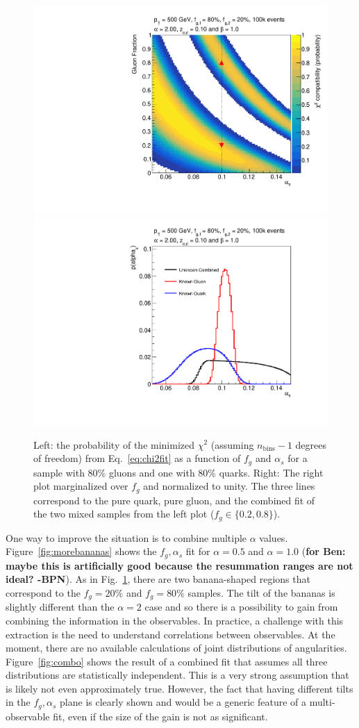 \begin{figure}[h!]
\begin{center}
\includegraphics[width = 0.45\columnwidth]{figures/banana_alpha_2_00beta_1_00_zcut_0_100.pdf}\includegraphics[width = 0.45\columnwidth]{figures/palpha_alpha_2_0beta_1_0_zcut_0_1000.pdf}
\end{center}
\caption{Left: the probability of the minimized $\chi^2$ (assuming
  $n_\text{bins}-1$ degrees of freedom) from Eq.~\ref{eq:chi2fit} as a
  function of $f_g$ and $\alpha_s$ for a sample with 80\% gluons and
  one with 80\% quarks.  Right: The right plot marginalized over $f_g$
  and normalized to unity.  The three lines correspond to the pure
  quark, pure gluon, and the combined fit of the two mixed samples
  from the left plot ($f_g\in\{0.2,0.8\}$).   }
\label{fig:alpha2fit}
\end{figure}

One way to improve the situation is to combine multiple $\alpha$ values.  Figure~\ref{fig:morebananas} shows the $f_g,\alpha_s$ fit for $\alpha = 0.5$ and $\alpha=1.0$ (\textbf{for Ben: maybe this is artificially good because the resummation ranges are not ideal? -BPN}).  As in Fig.~\ref{fig:alpha2fit}, there are two banana-shaped regions that correspond to the $f_g=20\%$ and $f_g=80\%$ samples.   The tilt of the bananas is slightly different than the $\alpha=2$ case and so there is a possibility to gain from combining the information in the observables.  In practice, a challenge with this extraction is the need to understand correlations between observables.  At the moment, there are no available calculations of joint distributions of angularities.  Figure~\ref{fig:combo} shows the result of a combined fit that assumes all three distributions are statistically independent.  This is a very strong assumption that is likely not even approximately true.  However, the fact that having different tilts in the $f_g,\alpha_s$ plane is clearly shown and would be a generic feature of a multi-observable fit, even if the size of the gain is not as significant. 

